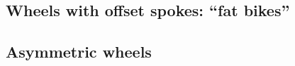 \documentclass[\rootdir/thesis.tex]{subfiles}
\begin{document}
\subsection{Wheels with offset spokes: ``fat bikes''}



\subsection{Asymmetric wheels}
\end{document}
